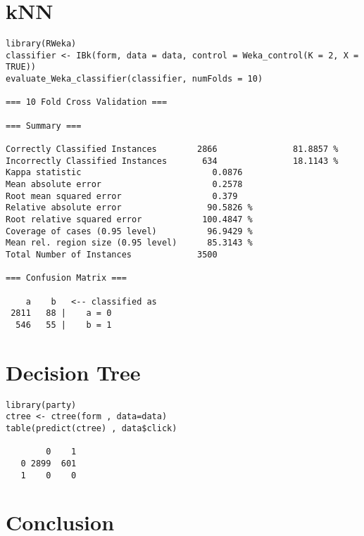 \documentclass[11pt,a4paper]{article}
\begin{document}
\section{kNN}
\label{sec-4}
\begin{verbatim}
library(RWeka)
classifier <- IBk(form, data = data, control = Weka_control(K = 2, X = TRUE))
evaluate_Weka_classifier(classifier, numFolds = 10)

=== 10 Fold Cross Validation ===

=== Summary ===

Correctly Classified Instances        2866               81.8857 %
Incorrectly Classified Instances       634               18.1143 %
Kappa statistic                          0.0876
Mean absolute error                      0.2578
Root mean squared error                  0.379 
Relative absolute error                 90.5826 %
Root relative squared error            100.4847 %
Coverage of cases (0.95 level)          96.9429 %
Mean rel. region size (0.95 level)      85.3143 %
Total Number of Instances             3500     

=== Confusion Matrix ===

    a    b   <-- classified as
 2811   88 |    a = 0
  546   55 |    b = 1
\end{verbatim}

\section{Decision Tree}
\label{sec-5}
\begin{verbatim}
library(party)
ctree <- ctree(form , data=data)
table(predict(ctree) , data$click)

        0    1
   0 2899  601
   1    0    0
\end{verbatim}

\section{Conclusion}
\label{sec-6}
\end{document}
